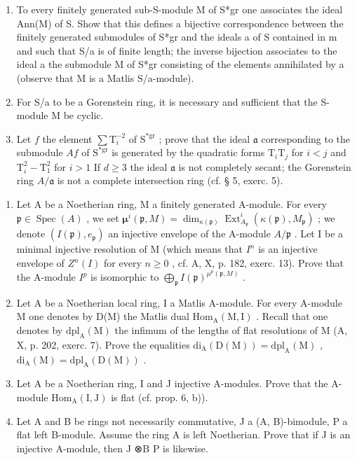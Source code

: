 \begin{enumerate}
\def\labelenumi{\alph{enumi})}
\item
  To every finitely generated sub-S-module M of S*gr one associates the ideal Ann(M) of S. Show that this defines a bijective correspondence between the finitely generated submodules of S*gr and the ideals a of S contained in m and such that S/a is of finite length; the inverse bijection associates to the ideal a the submodule M of S*gr consisting of the elements annihilated by a (observe that M is a Matlis S/a-module).
\item
  For S/a to be a Gorenstein ring, it is necessary and sufficient that the S-module M be cyclic.
\item
  Let \(f\) the element \(\sum \mathrm{T}_i^{-2}\) of \(\mathrm{S}^{*\mathrm{gr}}\) ; prove that the ideal \(\mathfrak{a}\) corresponding to the submodule \(A f\) of \(\mathrm{S}^{*\mathrm{gr}}\) is generated by the quadratic forms \(\mathrm{T}_i\mathrm{T}_j\) for \(i < j\) and \(\mathrm{T}_i^2 - \mathrm{T}_1^2\) for \(i > 1\) If \(d \geqslant 3\) the ideal \(\mathfrak{a}\) is not completely secant; the Gorenstein ring \(A / \mathfrak{a}\) is not a complete intersection ring (cf. § 5, exerc. 5).
\end{enumerate}

\begin{enumerate}
\def\labelenumi{\arabic{enumi})}
\setcounter{enumi}{3}
\item
  Let A be a Noetherian ring, M a finitely generated A-module. For every \(\mathfrak{p} \in \operatorname{Spec}(A)\) , we set \(\boldsymbol{\mu}^{i}(\mathfrak{p}, M) = \dim_{\kappa(\mathfrak{p})} \operatorname{Ext}_{A_{\mathfrak{p}}}^{i}(\kappa(\mathfrak{p}), M_{\mathfrak{p}})\) ; we denote \((I(\mathfrak{p}), e_{\mathfrak{p}})\) an injective envelope of the A-module \(A/\mathfrak{p}\) . Let I be a minimal injective resolution of M (which means that \(I^{n}\) is an injective envelope of \(Z^{n}(I)\) for every \(n \geqslant 0\) , cf. A, X, p. 182, exerc. 13). Prove that the A-module \(I^{p}\) is isomorphic to \(\bigoplus_{\mathfrak{p}} I(\mathfrak{p})^{\mu^{p}(\mathfrak{p}, M)}\) .
\item
  Let A be a Noetherian local ring, I a Matlis A-module. For every A-module M one denotes by D(M) the Matlis dual \(\mathrm{Hom}_{\mathrm{A}}(\mathrm{M},\mathrm{I})\) . Recall that one denotes by \(\mathrm{dpl}_{\mathrm{A}}(\mathrm{M})\) the infimum of the lengths of flat resolutions of M (A, X, p. 202, exerc. 7). Prove the equalities \(\mathrm{di}_{\mathrm{A}}(\mathrm{D}(\mathrm{M})) = \mathrm{dpl}_{\mathrm{A}}(\mathrm{M})\) , \(\mathrm{di}_{\mathrm{A}}(\mathrm{M}) = \mathrm{dpl}_{\mathrm{A}}(\mathrm{D}(\mathrm{M}))\) .
\item
  Let A be a Noetherian ring, I and J injective A-modules. Prove that the A-module \(\mathrm{Hom}_{\mathrm{A}}(\mathrm{I},\mathrm{J})\) is flat (cf. prop. 6, b)).
\item
  Let A and B be rings not necessarily commutative, J a (A, B)-bimodule, P a flat left B-module. Assume the ring A is left Noetherian. Prove that if J is an injective A-module, then J ⊗B P is likewise.
\end{enumerate}

